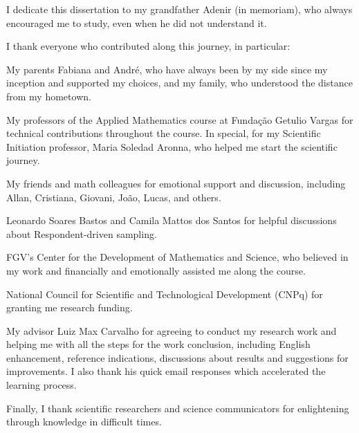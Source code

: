 \newpage

\begin{dedicatoria}
    \vspace*{\fill}
    \hfill
    \begin{minipage}{.6\textwidth}
        I dedicate this dissertation to my grandfather	Adenir (in memoriam), who always encouraged me to study, even
        when he did not understand it.
    \end{minipage}
\end{dedicatoria}
 
\begin{agradecimentos}
	I thank everyone who contributed along this journey, in particular:

    My parents Fabiana and André, who have always been by my side since my
    inception and supported my choices, and my family, who understood the distance from my hometown.

    My professors of the Applied Mathematics course at Fundação Getulio Vargas for technical contributions throughout the course. In special, for my Scientific Initiation professor, Maria Soledad Aronna, who helped me start the scientific journey. 

    My friends and math colleagues for emotional support and discussion, including Allan, Cristiana, Giovani, João, Lucas, and others.

    Leonardo Soares Bastos and Camila Mattos dos Santos for helpful discussions about Respondent-driven sampling.

    FGV's Center for the Development of Mathematics and Science, who believed
    in my work and financially and emotionally assisted me along the course.
    
    National Council for Scientific and Technological Development (CNPq) for
    granting me research funding.

    My advisor Luiz Max Carvalho for agreeing to conduct my research work and
    helping me with all the steps for the work conclusion, including English
    enhancement, reference indications, discussions about results and
    suggestions for improvements. I also thank his quick email responses which
    accelerated the learning process. 

    Finally, I thank scientific researchers and science communicators for enlightening through knowledge in difficult times.
\end{agradecimentos}

